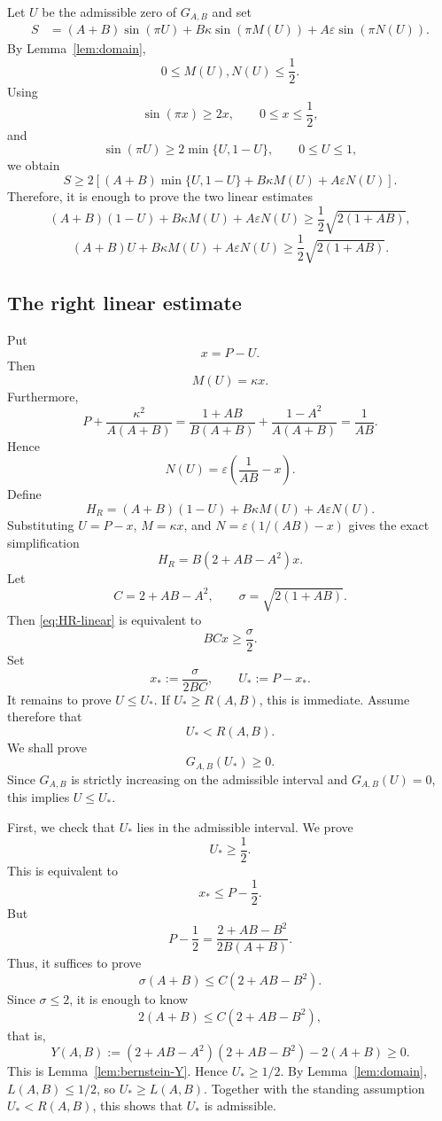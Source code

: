\documentclass[11pt]{amsart}
\theoremstyle{remark}
\newcommand{\eps}{\varepsilon}
\numberwithin{equation}{section}
\begin{document}
Let $U$ be the admissible zero of $G_{A,B}$ and set
\[
\begin{aligned}
        S&=(A+B)\sin(\pi U)
        +B\kappa\sin(\pi M(U))
        +A\eps\sin(\pi N(U)).
\end{aligned}
\]
By Lemma~\ref{lem:domain},
\[
        0\leq M(U),N(U)\leq \frac12.
\]
Using
\[
        \sin(\pi x)\geq 2x,
        \qquad 0\leq x\leq \frac12,
\]
and
\[
        \sin(\pi U)\geq 2\min\{U,1-U\},
        \qquad 0\leq U\leq 1,
\]
we obtain
\[
        S\geq 2\left[(A+B)\min\{U,1-U\}+B\kappa M(U)+A\eps N(U)\right].
\]
Therefore, it is enough to prove the two linear estimates
\begin{equation}\label{eq:HR-linear}
        (A+B)(1-U)+B\kappa M(U)+A\eps N(U)
        \geq \frac12\sqrt{2(1+AB)},
\end{equation}
\begin{equation}\label{eq:HL-linear}
        (A+B)U+B\kappa M(U)+A\eps N(U)
        \geq \frac12\sqrt{2(1+AB)}.
\end{equation}

\subsection{The right linear estimate}

Put
\[
        x=P-U.
\]
Then
\[
        M(U)=\kappa x.
\]
Furthermore,
\[
        P+\frac{\kappa^2}{A(A+B)}
        =\frac{1+AB}{B(A+B)}+
        \frac{1-A^2}{A(A+B)}
        =\frac1{AB}.
\]
Hence
\[
        N(U)=\eps\left(\frac1{AB}-x\right).
\]
Define
\[
        H_R=(A+B)(1-U)+B\kappa M(U)+A\eps N(U).
\]
Substituting $U=P-x$, $M=\kappa x$, and $N=\eps(1/(AB)-x)$ gives the exact simplification
\[
        H_R=B(2+AB-A^2)x.
\]
Let
\[
        C=2+AB-A^2,
        \qquad
        \sigma=\sqrt{2(1+AB)}.
\]
Then \eqref{eq:HR-linear} is equivalent to
\[
        BCx\geq \frac\sigma2.
\]
Set
\[
        x_*:=\frac{\sigma}{2BC},
        \qquad
        U_*:=P-x_*.
\]
It remains to prove $U\leq U_*$. If $U_*\geq R(A,B)$, this is immediate. Assume therefore that
\[
        U_*<R(A,B).
\]
We shall prove
\[
        G_{A,B}(U_*)\geq 0.
\]
Since $G_{A,B}$ is strictly increasing on the admissible interval and $G_{A,B}(U)=0$, this implies $U\leq U_*$.

First, we check that $U_*$ lies in the admissible interval. We prove
\[
        U_*\geq \frac12.
\]
This is equivalent to
\[
        x_*\leq P-\frac12.
\]
But
\[
        P-\frac12=\frac{2+AB-B^2}{2B(A+B)}.
\]
Thus, it suffices to prove
\[
        \sigma(A+B)\leq C(2+AB-B^2).
\]
Since $\sigma\leq 2$, it is enough to know
\[
        2(A+B)\leq C(2+AB-B^2),
\]
that is,
\[
        Y(A,B):=(2+AB-A^2)(2+AB-B^2)-2(A+B)\geq 0.
\]
This is Lemma~\ref{lem:bernstein-Y}. Hence $U_*\geq 1/2$. By Lemma~\ref{lem:domain}, $L(A,B)\leq 1/2$, so $U_*\geq L(A,B)$.  Together with the standing assumption $U_*<R(A,B)$, this shows that $U_*$ is admissible.
\end{document}
